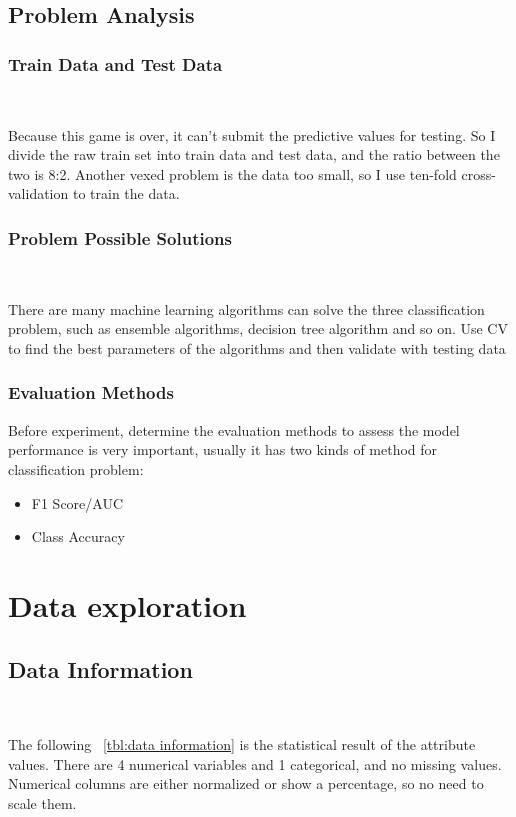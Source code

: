 \subsection{Problem Analysis}

\subsubsection{Train Data and Test Data}
\

Because this game is over, 
it can't submit the predictive values for testing. 
So I divide the raw train set into train data and test data, 
and the ratio between the two is 8:2. 
Another vexed problem is the data too small, 
so I use ten-fold cross-validation 
to train the data.


\subsubsection{Problem Possible Solutions}
\

There are many machine learning algorithms 
can solve the three classification problem,
such as ensemble algorithms,
decision tree algorithm and so on.
Use CV to find the best parameters of the algorithms 
and then validate with testing data 


\subsubsection{Evaluation Methods}


Before experiment, determine the evaluation methods
to assess the model performance is very important,
usually it has two kinds of method for classification problem:

\begin{itemize}
	\item F1 Score/AUC
	\item Class Accuracy
\end{itemize} 


\section{Data exploration} \label{sec-data_exploration}

\subsection{Data Information}
\

The following  ~\cref{tbl:data information}
is the statistical result of the attribute values.
There are 4 numerical variables and 1 categorical,
and no missing values.
Numerical columns are either normalized or show a percentage, 
so no need to scale them. 

